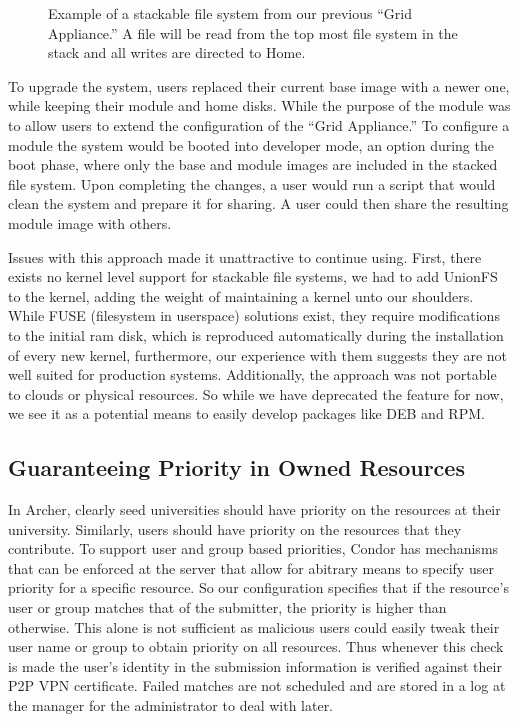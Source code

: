 \documentclass[conference]{IEEEtran}
\begin{document}
\begin{figure}[ht]
\centering
{}
\caption{Example of a stackable file system from our previous ``Grid
Appliance.''  A file will be read from the top most file system in the stack
and all writes are directed to Home.}
\label{fig:stackfs}
\end{figure}

To upgrade the system, users replaced their current base image with a newer
one, while keeping their module and home disks.  While the purpose of the
module was to allow users to extend the configuration of the ``Grid
Appliance.''  To configure a module the system would be booted into developer
mode, an option during the boot phase, where only the base and module images
are included in the stacked file system.  Upon completing the changes, a user
would run a script that would clean the system and prepare it for sharing.  A
user could then share the resulting module image with others.

Issues with this approach made it unattractive to continue using.  First, there
exists no kernel level support for stackable file systems, we had to add
UnionFS~\cite{unionfs} to the kernel, adding the weight of maintaining a kernel
unto our shoulders.  While FUSE (filesystem in userspace) solutions exist, they
require modifications to the initial ram disk, which is reproduced
automatically during the installation of every new kernel, furthermore, our
experience with them suggests they are not well suited for production systems.
Additionally, the approach was not portable to clouds or physical resources.
So while we have deprecated the feature for now, we see it as a potential means
to easily develop packages like DEB and RPM.

\subsection{Guaranteeing Priority in Owned Resources}

In Archer, clearly seed universities should have priority on the resources at
their university.  Similarly, users should have priority on the resources that
they contribute.  To support user and group based priorities, Condor has
mechanisms that can be enforced at the server that allow for abitrary means to
specify user priority for a specific resource.  So our configuration specifies
that if the resource's user or group matches that of the submitter, the
priority is higher than otherwise.  This alone is not sufficient as malicious
users could easily tweak their user name or group to obtain priority on all
resources.  Thus whenever this check is made the user's identity in the
submission information is verified against their P2P VPN certificate.  Failed
matches are not scheduled and are stored in a log at the manager for the
administrator to deal with later.
\end{document}

